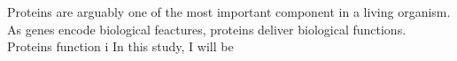Proteins are arguably one of the most important component in a living organism. As genes encode biological feactures, proteins deliver biological functions. Proteins function i In this study, I will be 